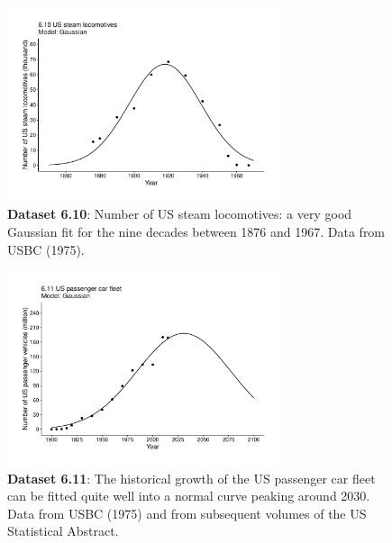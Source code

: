 \documentclass[aps,rmp,preprint,superscriptaddress,10pt,onecolumn]{article}
\begin{document}
\begin{figure}[h]
\includegraphics[width=8cm]{output/figs-ggplot/6.10.pdf}
\caption{\textbf{Dataset 6.10}: Number of US steam locomotives: a very good Gaussian fit for the nine decades between 1876 and 1967. Data from USBC (1975). }
\end{figure}
	
\begin{figure}[h]
\includegraphics[width=8cm]{output/figs-ggplot/6.11.pdf}
\caption{\textbf{Dataset 6.11}: The historical growth of the US passenger car fleet can be fitted quite well into a normal curve peaking around 2030. Data from USBC (1975) and from subsequent volumes of the US Statistical Abstract. }
\end{figure}
	
\end{document}
